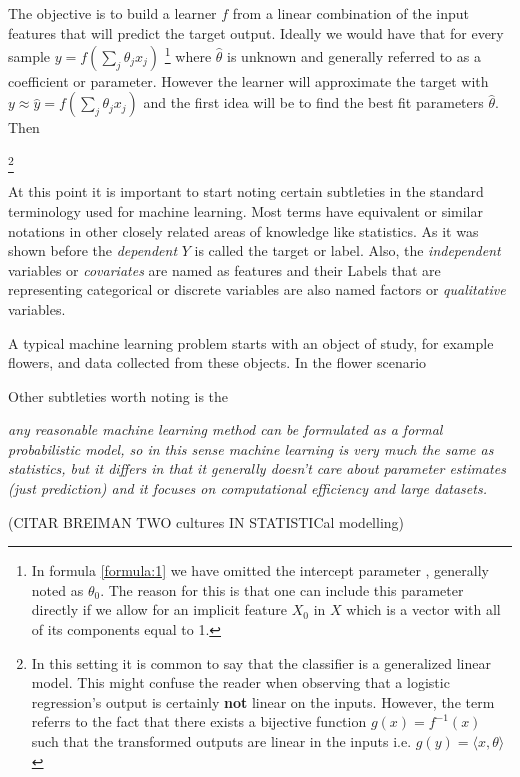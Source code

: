 The objective is to build a learner $f$ from a linear combination of the input features that will predict the target output. Ideally we would have that for every sample $y =  f\left(\sum_{j}\theta_jx_j\right)$ \label{formula:1} \footnote{In formula \ref{formula:1} we have omitted the intercept parameter , generally noted as $\theta_0$. The reason for this is that one can include this parameter directly if we allow for an implicit feature $X_0$ in $X$ which is a vector with all of its components equal to 1.  } where $\hat{\theta}$ is unknown and generally referred to as a coefficient or parameter. However the learner will approximate the target with $y \approx \hat{y} = f\left(\sum_{j}\theta_jx_j\right)$ and the first idea will be to find the best fit parameters $\hat{\theta}$. Then 

\footnote{In this setting it is common to say that the classifier is a generalized linear model. This might confuse the reader when observing that a logistic regression's output is certainly \textbf{not} linear on the inputs. However, the term referrs to the fact that there exists a bijective function $g(x) = f^{-1}(x)$ such that the transformed outputs are linear in the inputs i.e. $g(y) = \langle x, \theta \rangle$ }

At this point it is important to start noting certain subtleties in the standard terminology used for machine learning. Most terms have equivalent or similar notations in other closely related areas of knowledge like statistics. As it was shown before the \textit{dependent} $Y$ is called the target or label. Also, the \textit{independent} variables or \textit{covariates} are named as features and their 
Labels that are representing categorical or discrete variables are also named factors or \textit{qualitative} variables. 

A typical machine learning problem starts with an object of study, for example flowers, and data collected from these objects. In the flower scenario 

Other subtleties worth noting is the 

\textit{any reasonable machine learning method can be formulated as a formal probabilistic model, so in this sense machine learning is very much the same as statistics, but it differs in that it generally doesn't care about parameter estimates (just prediction) and it focuses on computational efficiency and large datasets.}

(CITAR BREIMAN \cite{breiman-statisticalmodeling} TWO cultures IN STATISTICal modelling)


